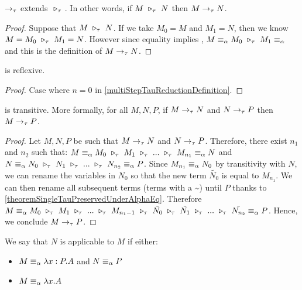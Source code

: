\begin{lemma}
    $\to_{\tau}$ extends $\ \triangleright_{\tau}\ $. In other words, if $M \ \triangleright_{\tau}\  N$ then $M \to_{\tau} N$.
\end{lemma}

\begin{proof}
    Suppose that $M \ \triangleright_{\tau}\  N$. If we take $M_{0}=M$ and $M_{1}=N$, then we know $M=M_{0} \ \triangleright_{\tau}\  M_{1}=N$. However since equality implies \alphaequivalence , $M \equiv_\alpha M_{0} \ \triangleright_{\tau}\  M_{1} \equiv_\alpha$ and this is the definition of $M \to_{\tau} N$.
\end{proof}


\begin{lemma}
    \taureduction is reflexive.
\end{lemma}

\begin{proof}
    Case where $n=0$ in \cref{multiStepTauReductionDefinition}.
\end{proof}

\begin{lemma}
    \taureduction is transitive. More formally, for all $M, N, P$, if $M \to_{\tau} N$ and $N \to_{\tau} P$ then $M \to_{\tau} P$.
\end{lemma}

\begin{proof}
    Let $M, N, P$ be such that $M \to_{\tau} N$ and $N \to_{\tau} P$. Therefore, there exist $n_1$ and $n_2$ such that:
    $M \equiv_\alpha M_{0} \ \triangleright_{\tau}\  M_{1} \ \triangleright_{\tau}\  ... \ \triangleright_{\tau}\  M_{n_1} \equiv_\alpha N$ and $N \equiv_\alpha N_{0} \ \triangleright_{\tau}\  N_{1} \ \triangleright_{\tau}\  ... \ \triangleright_{\tau}\  N_{n_2} \equiv_\alpha P$. Since $M_{n_1} \equiv_\alpha N_{0}$ by transitivity with $N$, we can rename the variables in $N_{0}$ so that the new term $\tilde{N_{0}}$ is equal to $M_{n_1}$. We can then rename all subsequent terms (terms with a \textasciitilde) until $P$ thanks to \cref{theoremSingleTauPreservedUnderAlphaEq}. Therefore $M \equiv_\alpha M_{0} \ \triangleright_{\tau}\  M_{1} \ \triangleright_{\tau}\  ... \ \triangleright_{\tau}\  M_{n_1-1} \ \triangleright_{\tau}\  \tilde{N_0} \ \triangleright_{\tau}\  \tilde{N_{1}} \ \triangleright_{\tau}\  ... \ \triangleright_{\tau}\  \tilde{N_{n_2}} \equiv_\alpha P$. Hence, we conclude $M \to_{\tau} P$.
\end{proof}

\begin{definition}
    We say that $N$ is applicable to $M$ if either:
    \begin{itemize}
        \item $M \equiv_\alpha \lambda x:P.A$ and $N \equiv_\alpha P$
        \item $M \equiv_\alpha \lambda x.A$
    \end{itemize}
\end{definition}

